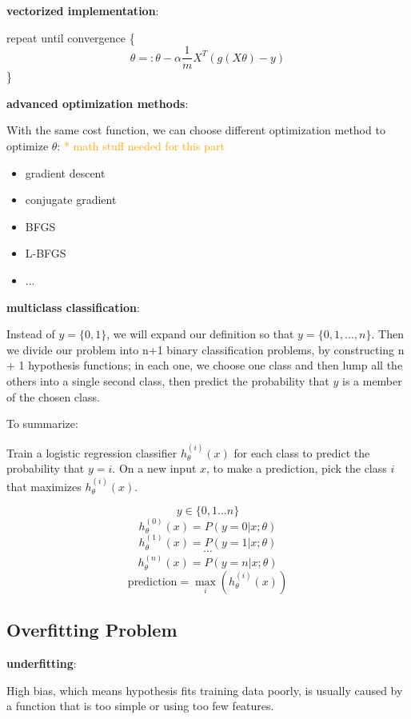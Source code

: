 \documentclass{article}
\begin{document}
\bigskip

\noindent \textbf{vectorized implementation}:

\noindent repeat until convergence \{
\[\theta =: \theta - \alpha \frac{1}{m} X^T (g(X\theta) - y)\]
\}

\bigskip

\noindent \textbf{advanced optimization methods}:

\noindent With the same cost function, we can choose different optimization method to optimize \(\theta\): \textcolor{orange}{ * math stuff needed for this part}

\begin{itemize}
\item gradient descent
\item conjugate gradient
\item BFGS
\item L-BFGS
\item ...
\end{itemize}

\bigskip

\noindent \textbf{multiclass classification}:

\noindent Instead of \(y = \{0, 1\}\), we will expand our definition so that \(y = \{0, 1, ..., n\}\). Then we divide our problem into n+1 binary classification problems, by constructing n + 1 hypothesis functions; in each one, we choose one class and then lump all the others into a single second class, then predict the probability that \(y\) is a member of the chosen class.

\bigskip

\noindent To summarize: 

\noindent Train a logistic regression classifier \(h_{\theta}^{(i)}(x)\) for each class to predict the probability that \(y = i\). On a new input \(x\), to make a prediction, pick the class \(i\) that maximizes \(h_{\theta} ^{(i)}(x)\).

\[y \in \{0, 1 ... n\}\] 
\[h_{\theta}^{(0)}(x) = P(y = 0 | x ; \theta)\]
\[h_{\theta}^{(1)}(x) = P(y = 1 | x ; \theta)\]
\[\cdots\]
\[h_{\theta}^{(n)}(x) = P(y = n | x ; \theta)\] 
\[\text{prediction} = \max_i(h_{\theta}^{(i)}(x))\]

\subsection{Overfitting Problem}

\noindent \textbf{underfitting}:

\noindent High bias, which means hypothesis fits training data poorly, is usually caused by a function that is too simple or using too few features. 
\end{document}
